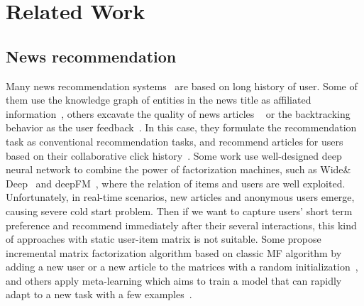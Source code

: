 \section{Related Work}
\subsection{News recommendation}
Many news recommendation systems~\cite{wu_neural_2019-1,wu2019npa} are based on long history of user. Some of them use the knowledge graph of entities in the news title as affiliated information~\cite{wang2018dkn,wang_ripplenet:_2018}, others excavate the quality of news articles ~\cite{lu_quality_2019} or the backtracking behavior as the user feedback~\cite{smadja_understanding_2019}. In this case, they formulate the recommendation task as conventional recommendation tasks, and recommend articles for users based on their collaborative click history~\cite{zhu2019dan}. Some work use well-designed deep neural network to combine the power of factorization machines, such as Wide\& Deep~\cite{cheng2016wide} and deepFM~\cite{guodeepfm2017}, where the relation of items and users are well exploited. Unfortunately, in real-time scenarios, new articles and anonymous users emerge, causing severe cold start problem. Then if we want to capture users' short term preference and recommend immediately after their several interactions, this kind of approaches with static user-item matrix is not suitable. Some propose incremental matrix factorization algorithm based on classic MF algorithm by adding a new user or a new article to the matrices with a random initialization~\cite{al2018adaptive}, and others apply meta-learning which aims to train a model that can rapidly adapt to a new task with a few examples~\cite{lee_melu:_2019}. 
